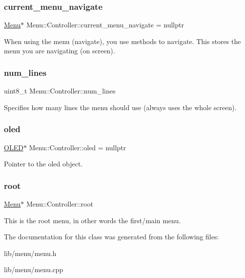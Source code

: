 \subsubsection{\texorpdfstring{current\+\_\+menu\+\_\+navigate}{current\_menu\_navigate}}
{\footnotesize\ttfamily \hyperlink{struct_menu_1_1_menu}{Menu}$\ast$ Menu\+::\+Controller\+::current\+\_\+menu\+\_\+navigate = nullptr\hspace{0.3cm}{\ttfamily [private]}}

When using the menu (navigate), you use methods to navigate. This stores the menu you are navigating (on screen). \hypertarget{class_menu_1_1_controller_a80d614a66d1ffa2612688776842f1f31}{}\label{class_menu_1_1_controller_a80d614a66d1ffa2612688776842f1f31} 
\subsubsection{\texorpdfstring{num\+\_\+lines}{num\_lines}}
{\footnotesize\ttfamily uint8\+\_\+t Menu\+::\+Controller\+::num\+\_\+lines\hspace{0.3cm}{\ttfamily [private]}}

Specifies how many lines the menu should use (always uses the whole screen). \hypertarget{class_menu_1_1_controller_aaa0388123d9e3bb0d4f546336e2b502d}{}\label{class_menu_1_1_controller_aaa0388123d9e3bb0d4f546336e2b502d} 
\subsubsection{\texorpdfstring{oled}{oled}}
{\footnotesize\ttfamily \hyperlink{class_o_l_e_d}{O\+L\+ED}$\ast$ Menu\+::\+Controller\+::oled = nullptr\hspace{0.3cm}{\ttfamily [private]}}

Pointer to the oled object. \hypertarget{class_menu_1_1_controller_a211b6de05f7eed25f3a7f504c42316e0}{}\label{class_menu_1_1_controller_a211b6de05f7eed25f3a7f504c42316e0} 
\subsubsection{\texorpdfstring{root}{root}}
{\footnotesize\ttfamily \hyperlink{struct_menu_1_1_menu}{Menu}$\ast$ Menu\+::\+Controller\+::root\hspace{0.3cm}{\ttfamily [private]}}

This is the root menu, in other words the first/main menu. 

The documentation for this class was generated from the following files\+:\begin{DoxyCompactItemize}
\item 
lib/menu/menu.\+h\item 
lib/menu/menu.\+cpp\end{DoxyCompactItemize}
